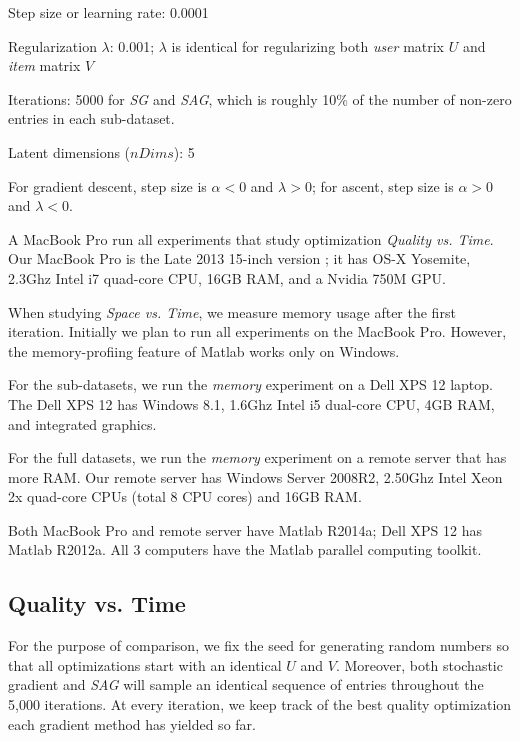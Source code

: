 \begin{sloppy}
\begin{compactitem}
\item Step size or learning rate: 0.0001
\item Regularization $\lambda$: 0.001; $\lambda$ is identical for regularizing both \emph{user} matrix $U$ and \emph{item} matrix $V$
\item Iterations: 5000 for \emph{SG} and \emph{SAG}, which is roughly 10\% of the number of non-zero entries in each sub-dataset.
\item Latent dimensions ($nDims$): 5 
\end{compactitem}
\end{sloppy}

For gradient descent, step size is $\alpha < 0$ and $\lambda > 0$;
for ascent, step size is $\alpha > 0$ and $\lambda < 0$.


A MacBook Pro run all experiments that study optimization \emph{Quality vs. Time}.
Our MacBook Pro is the Late 2013 15-inch version \cite{macbookprolo}; it has OS-X Yosemite, 2.3Ghz Intel i7 quad-core CPU, 16GB RAM, and a Nvidia 750M GPU.

When studying \emph{Space vs. Time}, we measure memory usage after the first iteration.  
Initially we plan to run all experiments on the MacBook Pro.
However, the memory-profiing feature of Matlab works only on Windows.  

For the sub-datasets, we run the \emph{memory} experiment on a Dell XPS 12 \cite{dellxps12} laptop.
The Dell XPS 12 has Windows 8.1, 1.6Ghz Intel i5 dual-core CPU, 4GB RAM, and integrated graphics.  

For the full datasets, we run the \emph{memory} experiment on a remote server that has more RAM.
Our remote server has Windows Server 2008R2, 2.50Ghz Intel Xeon 2x quad-core CPUs (total 8 CPU cores) and 16GB RAM.

Both MacBook Pro and remote server have Matlab R2014a; Dell XPS 12 has Matlab R2012a.
All 3 computers have the Matlab parallel computing toolkit.



\subsection{Quality vs. Time}
For the purpose of comparison, we fix the seed for generating random numbers so that all optimizations start with an identical $U$ and $V$.
Moreover, both stochastic gradient and \emph{SAG} will sample an identical sequence of entries throughout the 5,000 iterations.
At every iteration, we keep track of the best quality optimization each gradient method has yielded so far.

